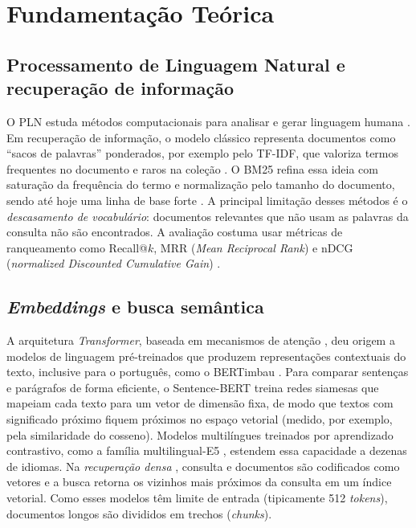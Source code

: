 \documentclass[12pt]{article}
\begin{document}
\section{Fundamentação Teórica}

\subsection{Processamento de Linguagem Natural e recuperação de informação}

O PLN estuda métodos computacionais para analisar e gerar linguagem humana
\cite{jurafsky2025}. Em recuperação de informação, o modelo clássico representa documentos como
``sacos de palavras'' ponderados, por exemplo pelo TF-IDF, que valoriza termos frequentes no
documento e raros na coleção \cite{manning2008}. O BM25 refina essa ideia com saturação da
frequência do termo e normalização pelo tamanho do documento, sendo até hoje uma linha de base
forte \cite{robertson2009}. A principal limitação desses métodos é o \emph{descasamento de
vocabulário}: documentos relevantes que não usam as palavras da consulta não são encontrados. A
avaliação costuma usar métricas de ranqueamento como Recall@$k$, MRR (\textit{Mean Reciprocal
Rank}) e nDCG (\textit{normalized Discounted Cumulative Gain}) \cite{manning2008}.

\subsection{\textit{Embeddings} e busca semântica}

A arquitetura \textit{Transformer}, baseada em mecanismos de atenção \cite{vaswani2017}, deu
origem a modelos de linguagem pré-treinados que produzem representações contextuais do texto,
inclusive para o português, como o BERTimbau \cite{souza2020}. Para comparar sentenças e
parágrafos de forma eficiente, o Sentence-BERT \cite{reimers2019} treina redes siamesas que
mapeiam cada texto para um vetor de dimensão fixa, de modo que textos com significado próximo
fiquem próximos no espaço vetorial (medido, por exemplo, pela similaridade do cosseno). Modelos
multilíngues treinados por aprendizado contrastivo, como a família multilingual-E5
\cite{wang2024e5}, estendem essa capacidade a dezenas de idiomas. Na \emph{recuperação densa}
\cite{karpukhin2020}, consulta e documentos são codificados como vetores e a busca retorna os
vizinhos mais próximos da consulta em um índice vetorial. Como esses modelos têm limite de
entrada (tipicamente 512 \textit{tokens}), documentos longos são divididos em trechos
(\textit{chunks}).
\end{document}
